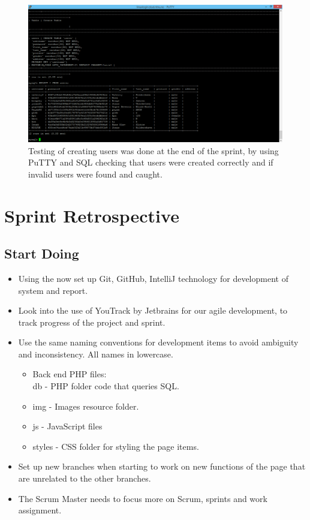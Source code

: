 \begin{figure}[ht!]
\centering
\includegraphics[width={\linewidth}]{Sprint2/img/Sprint2-testing.png}
\caption{ Testing of creating users was done at the end of the sprint, by using PuTTY and SQL checking that users were created correctly and if invalid users were found and caught. \label{overflow}}
\end{figure}

\section{Sprint Retrospective} 
\label{sec:S2Retrospective}


\subsection{Start Doing}
\label{subsec:S2RetrospectiveStart}
\begin{itemize}
\item Using the now set up Git, GitHub, IntelliJ technology for development of system and report.
\item Look into the use of YouTrack by Jetbrains for our agile development, to track progress of the project and sprint. 
\item Use the same naming conventions for development items to avoid ambiguity and inconsistency. All names in lowercase. 
\begin{itemize}
\item Back end PHP files: \\ db - PHP folder code that queries SQL.
\item img - Images resource folder. 
\item js - JavaScript files
\item styles - CSS folder for styling the page items. 
\end{itemize}
\item Set up new branches when starting to work on new functions of the page that are unrelated to the other branches. 
\item The Scrum Master needs to focus more on Scrum, sprints and work assignment.
\end{itemize}

